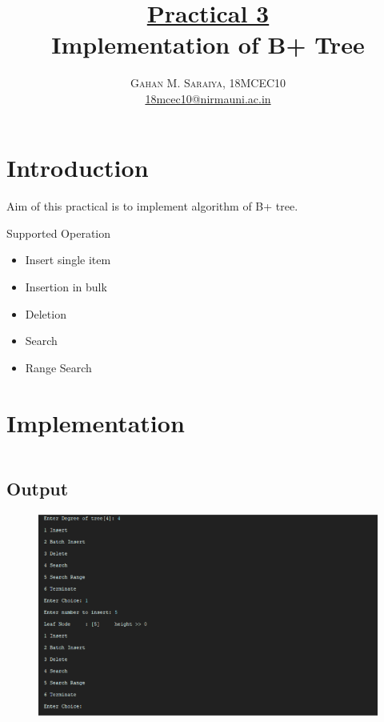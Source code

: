 \documentclass[paper=letter, fontsize=12pt]{article}
\title{\vspace{-15mm}\fontsize{24pt}{10pt}\selectfont\textbf{
		\underline{Practical 3}\\Implementation of B+ Tree}} %
\author{\large{\textsc{
		Gahan M. Saraiya, 18MCEC10 }}\\[2mm]
\normalsize \href{mailto:18mcec10@nirmauni.ac.in}{18mcec10@nirmauni.ac.in}\\[2mm] %
}
\date{}
\begin{document}
\maketitle %
\thispagestyle{fancy} %

\newcommand*\tick{\item[\Checkmark]}
\newcommand*\arrow{\item[$\Rightarrow$]}
\newcommand*\fail{\item[\XSolidBrush]}

\section{Introduction}
\paragraph{}
Aim of this practical is to implement algorithm of B+ tree.

Supported Operation
\begin{itemize}
	\item Insert single item
	\item Insertion in bulk
	\item Deletion
	\item Search
	\item Range Search
\end{itemize}

\section{Implementation}

\inputminted[frame=lines, breaklines, linenos]{python}{../btree_implementation/bPlusTree.py}

\subsection*{Output}
\begin{figure}[H]
	\includegraphics*[width=440px]{01.png}
\end{figure}
\end{document}
